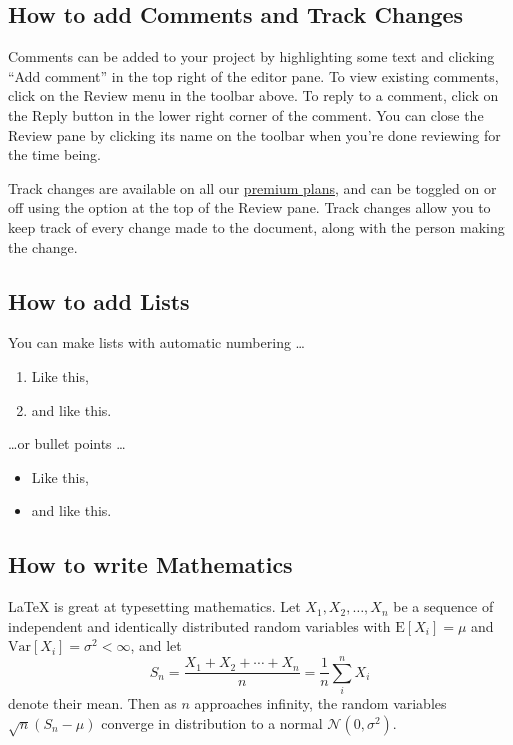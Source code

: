 \documentclass{article}
\begin{document}
\subsection{How to add Comments and Track Changes}

Comments can be added to your project by highlighting some text and clicking ``Add comment'' in the top right of the editor pane. To view existing comments, click on the Review menu in the toolbar above. To reply to a comment, click on the Reply button in the lower right corner of the comment. You can close the Review pane by clicking its name on the toolbar when you're done reviewing for the time being.

Track changes are available on all our \href{https://www.overleaf.com/user/subscription/plans}{premium plans}, and can be toggled on or off using the option at the top of the Review pane. Track changes allow you to keep track of every change made to the document, along with the person making the change.

\subsection{How to add Lists}

You can make lists with automatic numbering \dots

\begin{enumerate}
\item Like this,
\item and like this.
\end{enumerate}
\dots or bullet points \dots
\begin{itemize}
\item Like this,
\item and like this.
\end{itemize}

\subsection{How to write Mathematics}

\LaTeX{} is great at typesetting mathematics. Let $X_1, X_2, \ldots, X_n$ be a sequence of independent and identically distributed random variables with $\text{E}[X_i] = \mu$ and $\text{Var}[X_i] = \sigma^2 < \infty$, and let
\begin{equation}
\label{eq:sample-mean}
S_n = \frac{X_1 + X_2 + \cdots + X_n}{n}
      = \frac{1}{n}\sum_{i}^{n} X_i
\end{equation}
denote their mean. Then as $n$ approaches infinity, the random variables $\sqrt{n}(S_n - \mu)$ converge in distribution to a normal $\mathcal{N}(0, \sigma^2)$.
\end{document}
